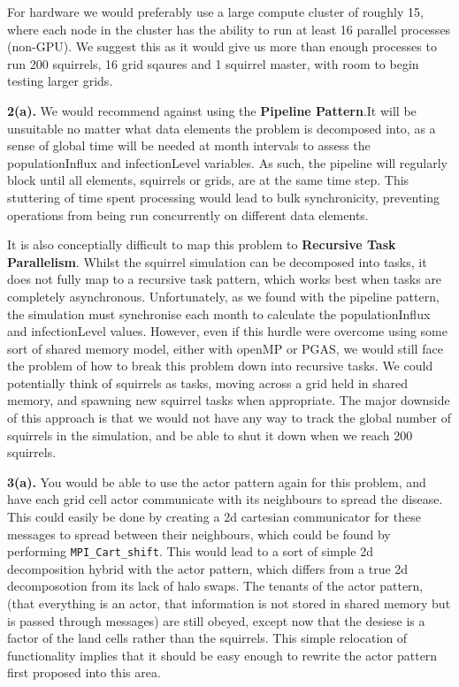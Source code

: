 \documentclass{article}
\begin{document}
For hardware we would preferably use a large compute cluster of roughly 15, where each node in the cluster has the ability to run at least 16 parallel processes (non-GPU). We suggest this as it would give us more than enough processes to run 200 squirrels, 16 grid sqaures and 1 squirrel master, with room to begin testing larger grids. \newline

\noindent\textbf{2(a).} \newline
We would recommend against using the \textbf{Pipeline Pattern}.It will be unsuitable no matter what data elements the problem is decomposed into, as a sense of global time will be needed at month intervals to assess the populationInflux and infectionLevel variables. As such, the pipeline will regularly block until all elements, squirrels or grids, are at the same time step. This stuttering of time spent processing would lead to bulk synchronicity, preventing operations from being run concurrently on different data elements.

It is also conceptially difficult to map this problem to \textbf{Recursive Task Parallelism}. Whilst the squirrel simulation can be decomposed into tasks, it does not fully map to a recursive task pattern, which works best when tasks are completely asynchronous. Unfortunately, as we found with the pipeline pattern, the simulation must synchronise each month to calculate the populationInflux and infectionLevel values. However, even if this hurdle were overcome using some sort of shared memory model, either with openMP or PGAS, we would still face the problem of how to break this problem down into recursive tasks.  We could potentially think of squirrels as tasks, moving across a grid held in shared memory, and spawning new squirrel tasks when appropriate. The major downside of this approach is that we would not have any way to track the global number of squirrels in the simulation, and be able to shut it down when we reach 200 squirrels. \newline

\noindent\textbf{3(a).} \newline
You would be able to use the actor pattern again for this problem, and have each grid cell actor communicate with its neighbours to spread the disease. This could easily be done by creating a 2d cartesian communicator for these messages to spread between their neighbours, which could be found by performing \texttt{MPI\_Cart\_shift}. This would lead to a sort of simple 2d decomposition hybrid with the actor pattern, which differs from a true 2d decomposotion from its lack of halo swaps. The tenants of the actor pattern, (that everything is an actor, that information is not stored in shared memory but is passed through messages) are still obeyed, except now that the desiese is a factor of the land cells rather than the squirrels. This simple relocation of functionality implies that it should be easy enough to rewrite the actor pattern first proposed into this area.
\end{document}
